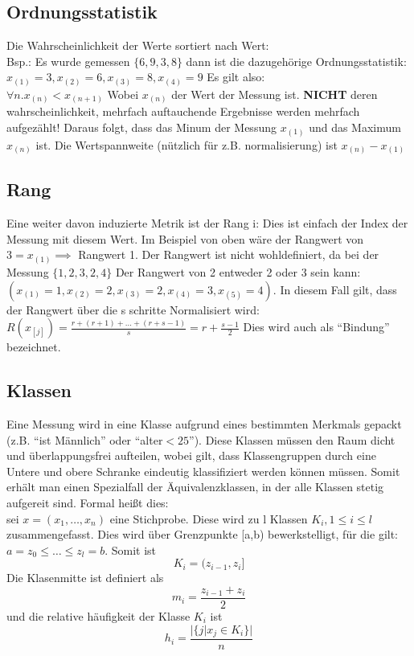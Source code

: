 \documentclass{article}
\begin{document}
	\subsection{Ordnungsstatistik}
	Die Wahrscheinlichkeit der Werte sortiert nach Wert:\\
	Bsp.: Es wurde gemessen $\{6,9,3,8\}$ dann ist die dazugehörige Ordnungsstatistik:\\
	$x_{(1)}=3, x_{(2)}=6,x_{(3)}=8,x_{(4)}=9$ Es gilt also:\\
	$\forall n. x_{(n)}<x_{(n+1)}$ Wobei $x_{(n)}$ der Wert der Messung ist. \textbf{NICHT} deren wahrscheinlichkeit, mehrfach auftauchende Ergebnisse werden mehrfach aufgezählt! Daraus folgt, dass das Minum der Messung $x_{(1)}$ und das Maximum $x_{(n)}$ ist. Die Wertspannweite (nützlich für z.B. normalisierung) ist $x_{(n)}-x_{(1)}$\\
	\subsection{Rang}
	Eine weiter davon induzierte Metrik ist der Rang i: Dies ist einfach der Index der Messung mit diesem Wert. Im Beispiel von oben wäre der Rangwert von $3=x_{(1)}\implies$ Rangwert 1. Der Rangwert ist nicht wohldefiniert, da bei der Messung $\{1,2,3,2,4\}$ Der Rangwert von 2 entweder 2 oder 3 sein kann: $(x_{(1)}=1,x_{(2)}=2,x_{(3)}=2,x_{(4)}=3,x_{(5)}=4)$. In diesem Fall gilt, dass der Rangwert über die s schritte Normalisiert wird: $R(x_{[j]}) = \frac{r+(r+1)+\dots+(r+s-1)}{s}= r+ \frac{s-1}{2}$ Dies wird auch als ``Bindung'' bezeichnet.\\
	\subsection{Klassen}
	Eine Messung wird in eine Klasse aufgrund eines bestimmten Merkmals gepackt (z.B. ``ist Männlich'' oder ``alter$<25$''). Diese Klassen müssen den Raum dicht und überlappungsfrei aufteilen, wobei gilt, dass Klassengruppen durch eine Untere und obere Schranke eindeutig klassifiziert werden können müssen. Somit erhält man einen Spezialfall der Äquivalenzklassen, in der alle Klassen stetig aufgereit sind.
	Formal heißt dies:\\
	sei $x = (x_1,\dots,x_n)$ eine Stichprobe. Diese wird zu l Klassen $K_i,1\leq i\leq l$ zusammengefasst. Dies wird über Grenzpunkte [a,b) bewerkstelligt, für die gilt:\\
	$a=z_0\leq\dots\leq z_l=b$. Somit ist
	\[K_i = (z_{i-1}, z_i]\]
	Die Klasenmitte ist definiert als 
	\[m_i = \frac{z_{i-1}+z_i}{2}\]
	und die relative häufigkeit der Klasse $K_i$ ist
	\[h_i=\frac{|\{j|x_j\in K_i\}|}{n}\]
	
\end{document}
